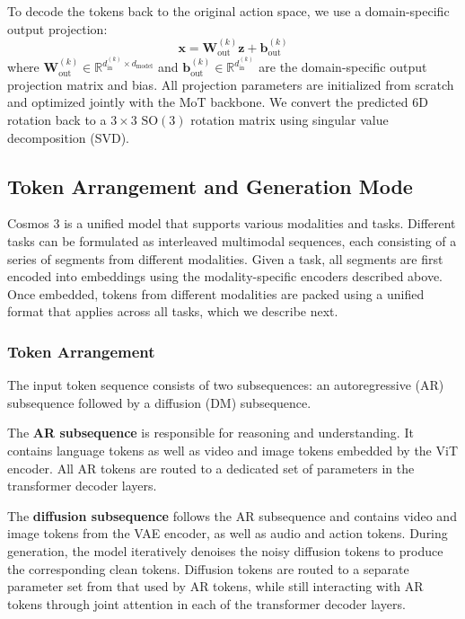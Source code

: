 \documentclass{llmxive}
\begin{document}
To decode the tokens back to the original action space, we use a domain-specific output projection:
\begin{equation}
    \mathbf{x} = \mathbf{W}_{\mathrm{out}}^{(k)} \mathbf{z} + \mathbf{b}_{\mathrm{out}}^{(k)}
\end{equation}
where $\mathbf{W}_{\mathrm{out}}^{(k)} \in \mathbb{R}^{d_{\text{in}}^{(k)} \times d_{\text{model}}}$ and $\mathbf{b}_{\mathrm{out}}^{(k)} \in \mathbb{R}^{d_{\text{in}}^{(k)}}$ are the domain-specific output projection matrix and bias.
All projection parameters are initialized from scratch and optimized jointly with the MoT backbone.
We convert the predicted 6D rotation back to a $3\times3$ $\mathrm{SO}(3)$ rotation matrix using singular value decomposition (SVD).

\subsection{Token Arrangement and Generation Mode}
Cosmos 3 is a unified model that supports various modalities and tasks.
Different tasks can be formulated as interleaved multimodal sequences, each consisting of a series of segments from different modalities. Given a task, all segments are first encoded into embeddings using the modality-specific encoders described above. Once embedded, tokens from different modalities are packed using a unified format that applies across all tasks, which we describe next.

\subsubsection{Token Arrangement}
The input token sequence consists of two subsequences: an autoregressive (AR) subsequence followed by a diffusion (DM) subsequence. 

The \textbf{AR subsequence} is responsible for reasoning and understanding. It contains language tokens as well as video and image tokens embedded by the ViT encoder.
All AR tokens are routed to a dedicated set of parameters in the transformer decoder layers.

The \textbf{diffusion subsequence} follows the AR subsequence and contains video and image tokens from the VAE encoder, as well as audio and action tokens. During generation, the model iteratively denoises the noisy diffusion tokens to produce the corresponding clean tokens. Diffusion tokens are routed to a separate parameter set from that used by AR tokens, while still interacting with AR tokens through joint attention in each of the transformer decoder layers.
\end{document}
